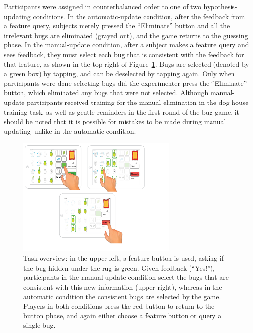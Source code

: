 \documentclass[man,floatsintext]{apa6}
\begin{document}
Participants were assigned in counterbalanced order to one of two hypothesis-updating conditions. In the automatic-update condition, after the feedback from a 
feature query, subjects merely pressed the ``Eliminate'' button and all the irrelevant bugs 
are eliminated (grayed out), and the game returns to the guessing phase. In the 
manual-update condition, after a subject makes a feature query and sees feedback, 
they must select each bug that is consistent with the feedback for that feature, as 
shown in the top right of Figure~\ref{fig:task-overview}. Bugs are selected (denoted by a green box) by 
tapping, and can be deselected by tapping again. Only when participants were done 
selecting bugs did the experimenter press the ``Eliminate'' button, which eliminated 
any bugs that were not selected. Although manual-update participants received 
training for the manual elimination in the dog house training task, as well as gentle 
reminders in the first round of the bug game, it should be noted that it is possible for 
mistakes to be made during manual updating--unlike in the automatic condition.


\begin{figure}[!h]
  \centering
  \includegraphics[width=0.7\textwidth]{figures/task_overview}
  \caption{Task overview: in the upper left, a feature button is used, asking if the bug 
hidden under the rug is green. Given feedback (``Yes!''), participants in the manual 
update condition select the bugs that are consistent with this new information (upper 
right), whereas in the automatic condition the consistent bugs are selected by the 
game. Players in both conditions press the red button to return to the button phase, 
and again either choose a feature button or query a single bug.}
  \label{fig:task-overview}
\end{figure} 

\end{document}
